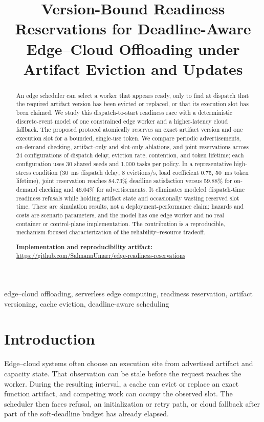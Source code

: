 \documentclass[conference]{IEEEtran}
\title{Version-Bound Readiness Reservations for Deadline-Aware Edge--Cloud Offloading under Artifact Eviction and Updates}
\author{\IEEEauthorblockN{Danish Atif (I22-1095) \qquad Salman Umar (I22-0908)}
\IEEEauthorblockA{Group G25, Section 7B, Cloud Computing\\
National University of Computer and Emerging Sciences, Pakistan}}
\begin{document}
\maketitle

\begin{abstract}
An edge scheduler can select a worker that appears ready, only to find at dispatch that the required artifact version has been evicted or replaced, or that its execution slot has been claimed. We study this dispatch-to-start readiness race with a deterministic discrete-event model of one constrained edge worker and a higher-latency cloud fallback. The proposed protocol atomically reserves an exact artifact version and one execution slot for a bounded, single-use token. We compare periodic advertisements, on-demand checking, artifact-only and slot-only ablations, and joint reservations across 24 configurations of dispatch delay, eviction rate, contention, and token lifetime; each configuration uses 30 shared seeds and 1,000 tasks per policy. In a representative high-stress condition (30~ms dispatch delay, 8 evictions/s, load coefficient 0.75, 50~ms token lifetime), joint reservation reaches 84.73\% deadline satisfaction versus 59.88\% for on-demand checking and 46.04\% for advertisements. It eliminates modeled dispatch-time readiness refusals while holding artifact state and occasionally wasting reserved slot time. These are simulation results, not a deployment-performance claim: hazards and costs are scenario parameters, and the model has one edge worker and no real container or control-plane implementation. The contribution is a reproducible, mechanism-focused characterization of the reliability--resource tradeoff.

\vspace{2pt}\noindent\textbf{Implementation and reproducibility artifact:}
\url{https://github.com/SalmannUmarr/edge-readiness-reservations}

\end{abstract}

\begin{IEEEkeywords}
edge--cloud offloading, serverless edge computing, readiness reservation,
artifact versioning, cache eviction, deadline-aware scheduling
\end{IEEEkeywords}

\section{Introduction}

Edge--cloud systems often choose an execution site from advertised artifact and capacity state. That observation can be stale before the request reaches the worker. During the resulting interval, a cache can evict or replace an exact function artifact, and competing work can occupy the observed slot. The scheduler then faces refusal, an initialization or retry path, or cloud fallback after part of the soft-deadline budget has already elapsed.
\end{document}
